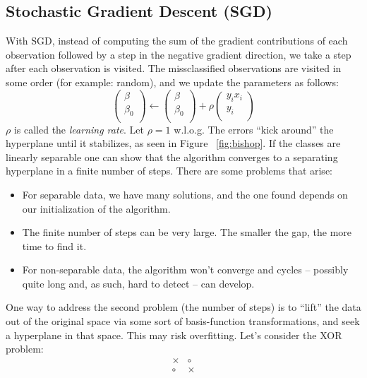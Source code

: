\documentclass[a4paper]{article}
\begin{document}
\subsection{Stochastic Gradient Descent (SGD)}

With SGD, instead of computing the sum of the gradient contributions of each observation followed by a step in the negative gradient direction, we take a step after each observation is visited. The missclassified observations are visited in some order (for example: random), and we update the parameters as follows:
$$\left(\begin{array}{cc}
\beta \\
\beta_0 \\
\end{array}\right)\leftarrow
\left(\begin{array}{cc}
\beta \\
\beta_0 \\
\end{array}\right)+\rho
\left(\begin{array}{cc}
y_ix_i \\
y_i \\
\end{array}\right)$$
$\rho$ is called the \textit{learning rate}. Let $\rho=1$ w.l.o.g. The errors ``kick around'' the hyperplane until it stabilizes, as seen in Figure ~\ref{fig:bishop}. If the classes are linearly separable one can show that the algorithm converges to a separating hyperplane in a finite number of steps. There are some problems that arise:

\begin{itemize}
\item For separable data, we have many solutions, and the one found depends on our initialization of the algorithm.
\item The finite number of steps can be very large. The smaller the gap, the more time to find it.
\item For non-separable data, the algorithm won't converge and cycles -- possibly quite long and, as such, hard to detect -- can develop.
\end{itemize}

One way to address the second problem (the number of steps) is to ``lift'' the data out of the original space via some sort of basis-function transformations, and seek a hyperplane in that space. This may risk overfitting.
Let's consider the XOR problem:
$$\begin{array}{cc}
\times & \circ \\
\circ & \times \\
\end{array}$$
\end{document}
